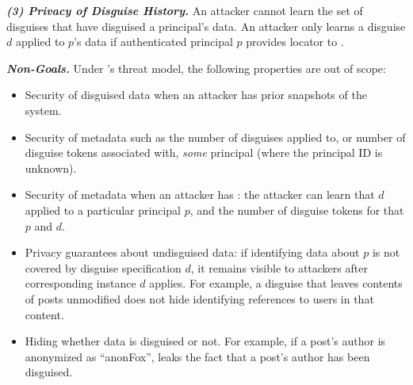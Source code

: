 \vspace{6pt}\noindent\textbf{\emph{(3) Privacy of Disguise History.}}
%
An attacker cannot learn the set of disguises that have disguised a principal's data.
%
An attacker only learns a disguise $d$ applied to $p$'s data if authenticated principal $p$ provides
locator  to \sys.

\vspace{6pt}\noindent\textbf{\emph{Non-Goals.}}
%
Under \sys's threat model, the following properties are out of scope:
%
\begin{itemize}
    \item Security of disguised data when an attacker has prior snapshots of the system.
    \item Security of metadata such as the number of disguises applied to, or number of
        disguise tokens associated with, \emph{some} principal (where the principal
        ID is unknown).
    \item Security of metadata when an attacker has : the attacker can learn that $d$
        applied to a particular principal $p$, and the number of disguise tokens for that $p$ and $d$.
    \item Privacy guarantees about undisguised data: if identifying data about $p$ is not covered by
        disguise specification $d$, it remains visible to attackers after corresponding instance $d$ applies.
        For example, a disguise that leaves contents of posts unmodified does not hide identifying references
	to users in that content.
    \item Hiding whether data is disguised or not. For example, if a post's author is anonymized as ``anonFox'',
        \sys leaks the fact that a post's author has been disguised.
\end{itemize}
